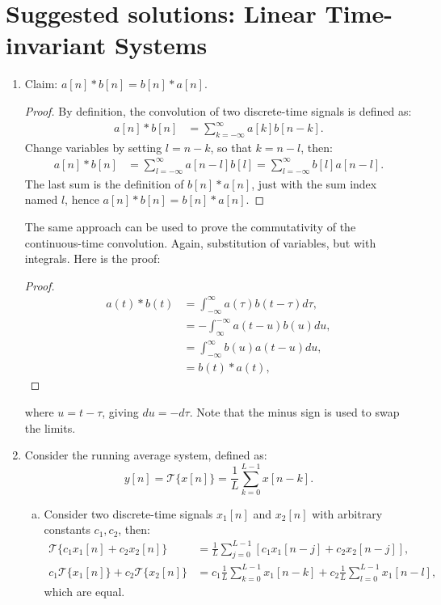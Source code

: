 \newpage
\section{Suggested solutions: Linear Time-invariant Systems}
\begin{enumerate}

\item Claim: $a[n]*b[n]=b[n]*a[n]$.
\begin{proof}
By definition, the convolution of two discrete-time signals is defined as:
\begin{align*}
    a[n]*b[n]&=\sum_{k=-\infty}^{\infty} a[k]b[n-k].
\end{align*}
Change variables by setting $l=n-k$, so that $k=n-l$, then:
\begin{align*}
    a[n]*b[n]&=\sum_{l=-\infty}^{\infty}a[n-l]b[l]=\sum_{l=-\infty}^{\infty}b[l]a[n-l].
\end{align*}
The last sum is the definition of $b[n]*a[n]$, just with the sum index named $l$, hence $a[n]*b[n]=b[n]*a[n]$. 
\end{proof}
The same approach can be used to prove the commutativity of the continuous-time convolution. Again, substitution of variables, but with integrals. Here is the proof:
\begin{proof}
\begin{align*}
    a(t)*b(t) &= \int_{-\infty}^{\infty}a(\tau)b(t-\tau)d\tau, \\
              &= -\int_{\infty}^{-\infty}a(t-u)b(u)du, \\
              &= \int_{-\infty}^{\infty}b(u)a(t-u)du, \\
              &= b(t) * a(t),
\end{align*}
\end{proof}
where $u=t-\tau$, giving $du=-d\tau$. Note that the minus sign is used to swap the limits. 

\item Consider the running average system, defined as:
$$y[n]=\mathcal{T}\{x[n]\}=\frac{1}{L}\sum_{k=0}^{L-1}x[n-k].$$

\begin{enumerate}[a)]
\item Consider two discrete-time signals $x_{1}[n]$ and $x_{2}[n]$ with arbitrary constants $c_{1},c_{2}$, then:
\begin{align*}
    \mathcal{T}\{c_{1}x_{1}[n]+c_{2}x_{2}[n]\}&=\frac{1}{L}\sum_{j=0}^{L-1}[c_{1}x_{1}[n-j]+c_{2}x_{2}[n-j]], \\
    c_{1}\mathcal{T}\{x_{1}[n]\}+c_{2}\mathcal{T}\{x_{2}[n]\}&=c_{1}\frac{1}{L}\sum_{k=0}^{L-1}x_{1}[n-k]+c_{2}\frac{1}{L}\sum_{l=0}^{L-1}x_{1}[n-l],
\end{align*}
which are equal. 


\end{enumerate}
\end{enumerate}
